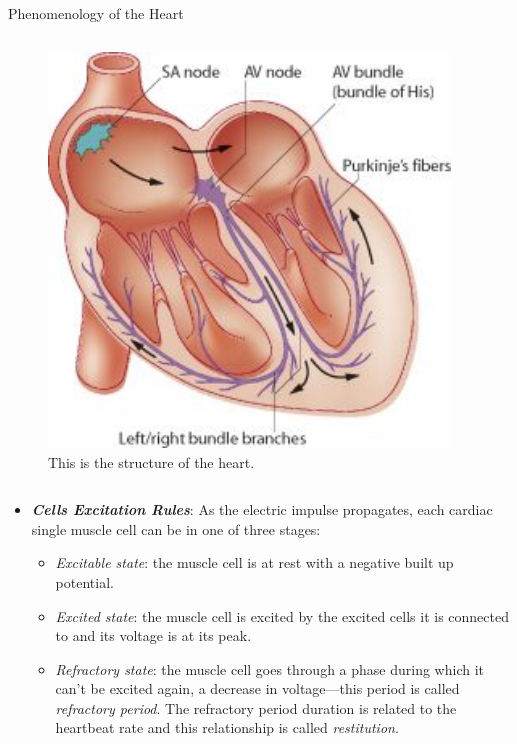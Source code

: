 \documentclass[final,hyperref={pdfpagelabels=false}]{beamer}
\begin{document}
\begin{frame}[t]
\begin{columns}[t]
\begin{column}{.465\textwidth}
\begin{block}{Phenomenology of the Heart}
\begin{columns}
\begin{column}{.43\textwidth}
	\begin{figure}
	
	
	\includegraphics[width=0.95\textwidth]{heart}
	\caption{\label{fig:frog1}This is the structure of the heart.}
	\end{figure}
\end{column}
\end{columns}
\begin{itemize}

	\item \textbf{ \textit{Cells Excitation Rules}}: As the electric impulse propagates, each cardiac single muscle cell can be in one of three stages:

		\begin{itemize}
 		 \item \textit{Excitable state}: the muscle cell is at rest with a negative built up potential.
  										
  		\item \textit{Excited state}: the muscle cell is excited by the excited cells it is connected to and its voltage is at its peak. 
  		\item \textit{Refractory state}: the muscle cell goes through a phase during which it can't be excited again, a decrease in voltage---this period is called \textit{refractory period}. The refractory period duration is related to the heartbeat rate and this relationship is called \textit{restitution}.
		\end{itemize}  


\end{itemize}
\end{block}
\end{column}
\end{columns}
\end{frame}
\end{document}
